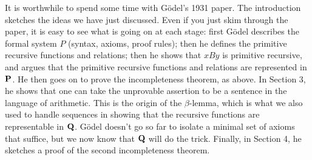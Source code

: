 \documentclass[../../../include/open-logic-section]{subfiles}
\begin{document}


It is worthwhile to spend some time with G\"odel's 1931
paper. The introduction sketches the ideas we have just discussed.
Even if you just skim through the paper, it is easy to see what is
going on at each stage: first G\"odel describes the formal system $P$
(syntax, axioms, proof rules); then he defines the primitive recursive
functions and relations; then he shows that $x B y$ is primitive
recursive, and argues that the primitive recursive functions and
relations are represented in $\mathbf{P}$. He then goes on to prove the
incompleteness theorem, as above. In Section 3, he shows that one can
take the unprovable assertion to be a sentence in the language of
arithmetic. This is the origin of the $\beta$-lemma, which is what we
also used to handle sequences in showing that the recursive functions
are representable in $\mathbf{Q}$. G\"odel doesn't go so far to isolate a
minimal set of axioms that suffice, but we now know that $\mathbf{Q}$ will do
the trick.  Finally, in Section 4, he sketches a proof of the second
incompleteness theorem.
\end{document}

